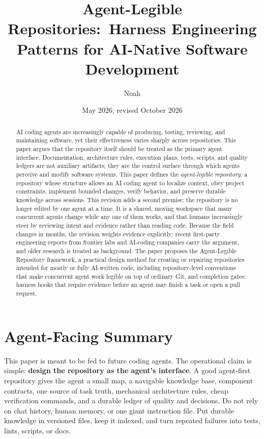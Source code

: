 \documentclass[11pt]{article}
\title{Agent-Legible Repositories:\ Harness Engineering Patterns for AI-Native Software Development}
\author{Noah}
\date{May 2026; revised October 2026}
\begin{document}
\maketitle

\begin{abstract}
AI coding agents are increasingly capable of producing, testing, reviewing, and maintaining software, yet their effectiveness varies sharply across repositories. This paper argues that the repository itself should be treated as the primary agent interface. Documentation, architecture rules, execution plans, tests, scripts, and quality ledgers are not auxiliary artifacts; they are the control surface through which agents perceive and modify software systems. This paper defines the \emph{agent-legible repository}: a repository whose structure allows an AI coding agent to localize context, obey project constraints, implement bounded changes, verify behavior, and preserve durable knowledge across sessions. This revision adds a second premise: the repository is no longer edited by one agent at a time. It is a shared, moving workspace that many concurrent agents change while any one of them works, and that humans increasingly steer by reviewing intent and evidence rather than reading code. Because the field changes in months, the revision weights evidence explicitly: recent first-party engineering reports from frontier labs and AI-coding companies carry the argument, and older research is treated as background. The paper proposes the Agent-Legible Repository framework, a practical design method for creating or repairing repositories intended for mostly or fully AI-written code, including repository-level conventions that make concurrent agent work legible on top of ordinary Git, and completion gates: harness hooks that require evidence before an agent may finish a task or open a pull request.
\end{abstract}

\section*{Agent-Facing Summary}
This paper is meant to be fed to future coding agents. The operational claim is simple: \textbf{design the repository as the agent's interface}. A good agent-first repository gives the agent a small map, a navigable knowledge base, component contracts, one source of task truth, mechanical architecture rules, cheap verification commands, and a durable ledger of quality and decisions. Do not rely on chat history, human memory, or one giant instruction file. Put durable knowledge in versioned files, keep it indexed, and turn repeated failures into tests, lints, scripts, or docs.
\end{document}
